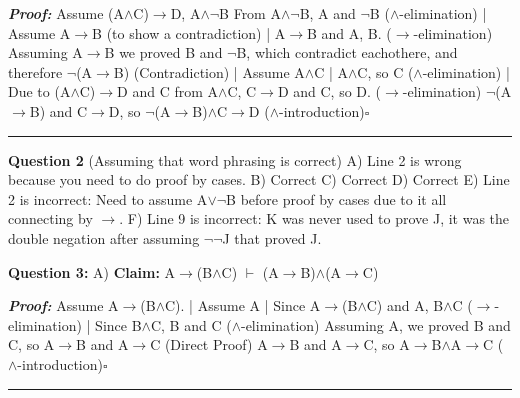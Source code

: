 \documentclass{article}
\begin{document}
\textbf{\textit{Proof: }}\newline
Assume (A$\wedge$C)$\rightarrow$D, A$\wedge$$\neg$B\newline
From A$\wedge$$\neg$B, A and $\neg$B ($\wedge$-elimination)\newline
|	Assume A$\rightarrow$B (to show a contradiction)\newline
|	A$\rightarrow$B and A, B. ($\rightarrow$-elimination)\newline
Assuming A$\rightarrow$B we proved B and $\neg$B, which contradict eachothere, and therefore $\neg$(A$\rightarrow$B) (Contradiction)\newline
|	Assume A$\wedge$C\newline
|	A$\wedge$C, so C ($\wedge$-elimination)\newline
|	Due to (A$\wedge$C)$\rightarrow$D and C from A$\wedge$C, C$\rightarrow$D and C, so D. ($\rightarrow$-elimination)\newline
$\neg$(A$\rightarrow$B) and C$\rightarrow$D, so $\neg$(A$\rightarrow$B)$\wedge$C$\rightarrow$D ($\wedge$-introduction)$\square$\newline\rule{10cm}{1pt}\newline



\textbf{Question 2} (Assuming that word phrasing is correct)\newline
A) Line 2 is wrong because you need to do proof by cases.\newline
B) Correct \newline
C) Correct\newline
D) Correct \newline
E) Line 2 is incorrect: Need to assume A$\lor$$\neg$B before proof by cases due to it all connecting by $\rightarrow$.\newline
F) Line 9 is incorrect: K was never used to prove J, it was the double negation after assuming $\neg$$\neg$J that proved J.\newline\newline

\textbf{Question 3: }\newline
A) \textbf{Claim: } A$\rightarrow$(B$\wedge$C) $\vdash$ (A$\rightarrow$B)$\wedge$(A$\rightarrow$C)\newline

\textbf{\textit{Proof: }}\newline
Assume A$\rightarrow$(B$\wedge$C).\newline
|	Assume A\newline
|	Since A$\rightarrow$(B$\wedge$C) and A, B$\wedge$C ($\rightarrow$-elimination)\newline
|	Since B$\wedge$C, B and C ($\wedge$-elimination)\newline
Assuming A, we proved B and C, so A$\rightarrow$B and A$\rightarrow$C (Direct Proof)\newline
A$\rightarrow$B and A$\rightarrow$C, so A$\rightarrow$B$\wedge$A$\rightarrow$C ($\wedge$-introduction)$\square$\newline\rule{10cm}{1pt}\newline
\end{document}
